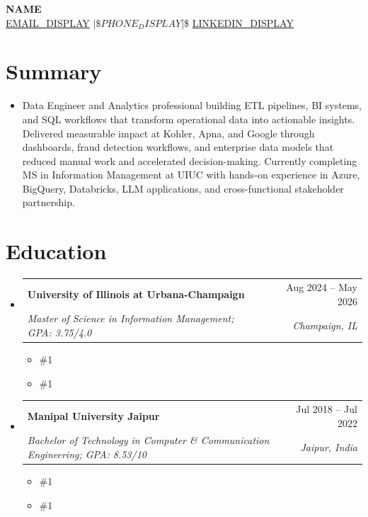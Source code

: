 \documentclass[letterpaper,11pt]{article}
\makeatletter
\newcommand{\resumeSubheading}[4]{
  \vspace{0pt}\item
    \begin{tabular*}{\textwidth}{l@{\extracolsep{\fill}}r}
      \textbf{#1} & #2 \\
      \textit{#3} & \textit{#4} \\ 
    \end{tabular*}\vspace{-6pt}
}
\newcommand{\resumeEducationCoursework}[1]{
  \vspace{-9pt} 
  \begin{itemize}[leftmargin=0pt, label={}]
    \item {\#1}
  \end{itemize}
}
\newcommand{\resumeEducationCertifications}[1]{
  \vspace{-15pt} 
  \begin{itemize}[leftmargin=0pt, label={}]
    \item {\#1}
  \end{itemize}
}
\newcommand{\resumeSubHeadingListStart}{\begin{itemize}[leftmargin=0pt,label={},itemsep=-2pt]}
\newcommand{\resumeSubHeadingListEnd}{\end{itemize}}
\makeatother
\begin{document}
\justifying

\begin{center}
    \textbf{\LARGE {{NAME}}} \\ \vspace{5pt}
    \href{mailto:{{EMAIL_URL}}}{{EMAIL_DISPLAY}} $|\$ {{PHONE_DISPLAY}} $|\$ \href{%
      {{LINKEDIN_URL}}%
    }{%
      {{LINKEDIN_DISPLAY}}%
    }
\end{center}

\section{Summary}
\begin{itemize}[leftmargin=0pt, label={}]
  \item { Data Engineer and Analytics professional building ETL pipelines, BI systems, and SQL workflows that transform operational data into actionable insights. Delivered measurable impact at Kohler, Apna, and Google through dashboards, fraud detection workflows, and enterprise data models that reduced manual work and accelerated decision-making. Currently completing MS in Information Management at UIUC with hands-on experience in Azure, BigQuery, Databricks, LLM applications, and cross-functional stakeholder partnership. }
\end{itemize}

\section{Education}
  \resumeSubHeadingListStart
    \resumeSubheading
      {University of Illinois at Urbana-Champaign}{Aug 2024 -- May 2026}
      {Master of Science in Information Management; GPA: 3.75/4.0}{Champaign, IL}
      \resumeEducationCoursework{Relevant Coursework: Applied Machine Learning, Cloud Computing Applications, Data Mining, Data Warehousing \& Business Intelligence, Information Modeling, Data Visualization}
      \resumeEducationCertifications{Certifications: Microsoft Azure Fundamentals, Cloud Computing, Complete Prompt Engineering for AI}

    \resumeSubheading
      {Manipal University Jaipur}{Jul 2018 -- Jul 2022}
      {Bachelor of Technology in Computer \& Communication Engineering; GPA: 8.53/10}{Jaipur, India}
      \resumeEducationCoursework{Relevant Coursework: Data Structures \& Algorithms, Database Management Systems, Operating Systems, Computer Networks}
      \resumeEducationCertifications{Certifications: Google Project Management, Networking in Google Cloud, Architecting with Google Kubernetes Engine}
  \resumeSubHeadingListEnd
\end{document}
